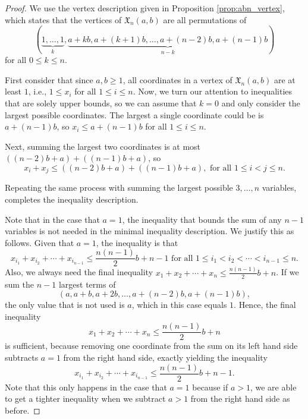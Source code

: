 \documentclass[11pt]{amsart}
\theoremstyle{definition}
\newcommand{\0}{\emptyset}
\newcommand{\Xn}{\mathfrak{X}_{n}(a,b)}
\begin{document}
\begin{proof}
We use the vertex description given in Proposition \ref{prop:abn_vertex}, which states that the vertices of $\Xn$ are all permutations of 
\[ (\underbrace{1, \ldots, 1}_k, \underbrace{a+kb, a+(k+1)b, \ldots, a+(n-2)b, a+(n-1)b}_{n-k})\] for all $0 \leq k \leq n$.

First consider that since $a,b \geq 1$, all coordinates in a vertex of $\Xn$ are at least $1$, i.e., $1 \leq x_i$ for all $1 \leq i \leq n$. 
Now, we turn our attention to inequalities that are solely upper bounds, so we can assume that $k=0$ and only consider the largest possible coordinates. 
The largest a single coordinate could be is $a+(n-1)b$, so $x_i \leq a+(n-1)b$ for all $1\leq i \leq n$.

Next, summing the largest two coordinates is at most $\left((n-2)b+a\right) + \left( (n-1)b+a\right)$, so \[x_i + x_j \leq \left((n-2)b+a\right) + \left( (n-1)b+a\right), \text{ for all } 1 \leq i < j \leq n.\]

Repeating the same process with summing the largest possible $3, \ldots, n$ variables, completes the inequality description.

Note that in the case that $a=1$, the inequality that bounds the sum of any $n-1$ variables is not needed in the minimal inequality description.
We justify this as follows.
Given that $a=1$, the inequality is that \[x_{i_1}+ x_{i_2}+ \cdots + x_{i_{n-1}} \leq \frac{n(n-1)}{2} b +n-1 \text{ for all } 1 \leq i_1 < i_2 < \cdots < i_{n-1} \leq n.\] 
Also, we always need the final inequality $x_{1}+ x_{2}+ \cdots + x_{n} \leq \frac{n(n-1)}{2} b +n$. 
If we sum the $n-1$ largest terms of \[ (a, a+b, a+2b, \ldots, a+(n-2)b, a+(n-1)b),\] the only value that is not used is $a$, which in this case equals $1$. 
Hence, the final inequality \[x_{1}+ x_{2}+ \cdots + x_{n} \leq \frac{n(n-1)}{2} b +n\] is sufficient, because removing one coordinate from the sum on its left hand side subtracts $a=1$ from the right hand side, exactly yielding the inequality \[x_{i_1}+ x_{i_2}+ \cdots + x_{i_{n-1}} \leq \frac{n(n-1)}{2} b +n-1.\] 
Note that this only happens in the case that $a=1$ because if $a>1$, we are able to get a tighter inequality when we subtract $a >1$ from the right hand side as before.


\end{proof}
\end{document}
